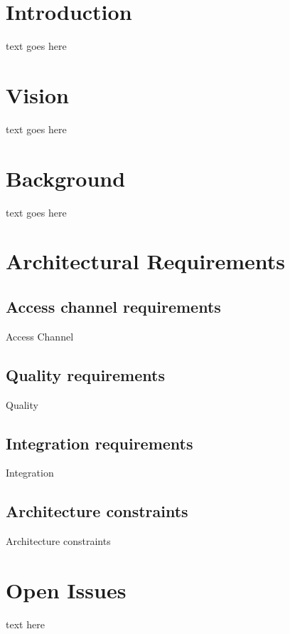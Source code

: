 \documentclass[10pt]{article}
\begin{document}

\newpage
\tableofcontents
\newpage
\listoffigures
\newpage

\section{Introduction}
text goes here

\section{Vision}
text goes here

\section{Background}
text goes here

\section{Architectural Requirements}
\subsection{Access channel requirements}
Access Channel
\clearpage
\subsection{Quality requirements}
Quality
\clearpage
\subsection{Integration requirements}
Integration
\clearpage
\subsection{Architecture constraints}
Architecture constraints

\clearpage

\section{Open Issues}
text here
\end{document}
